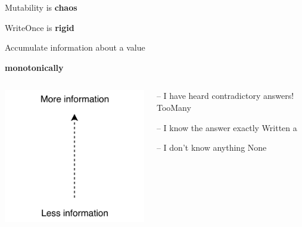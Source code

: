 \documentclass[UKenglish,usenames,dvipsnames,svgnames,table,aspectratio=169,mathserif]{beamer}
\newcommand{\nl}{\vspace{\baselineskip}}
\newcommand{\pnl}{\pause \nl}
\begin{document}
\begin{frame}

\centering \LARGE

Mutability is {\bf chaos}

\nl
WriteOnce is {\bf rigid}
\end{frame}


\begin{frame}[fragile]

\LARGE
\begin{center}
Accumulate information about a value

\pnl

{\bf monotonically}
\end{center}
\end{frame}





\begin{frame}[fragile]

\begin{columns}

\begin{column}{0.3\textwidth}
\includegraphics[scale=1.3]{set/more-info.pdf}
\end{column}

\begin{column}{0.6\textwidth}
\begin{haskellcode}
  -- I have heard contradictory answers!
    TooMany

  -- I know the answer exactly
    Written a

  -- I don't know anything
    None
\end{haskellcode}

\end{column}

\end{columns}
\end{frame}
\end{document}
